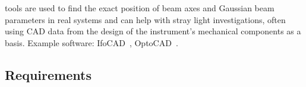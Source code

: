  tools are used to find the exact position of beam axes and Gaussian beam parameters in real systems and can help with stray light investigations, often using \ac{CAD} data from the design of the instrument's mechanical components as a basis. Example software: \acs{IfoCAD}~\cite{IfoCAD, kochkina}, \acs{OptoCAD}~\cite{OptoCAD}.

\subsection{Requirements}
\label{sec:Sim:Req}


